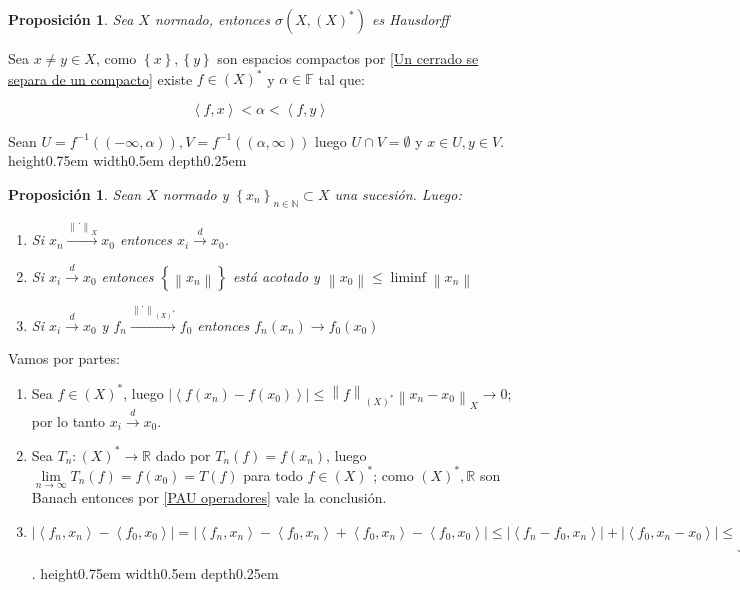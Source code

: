 \documentclass[11pt]{article}
\newcommand{\R}{{\mathbb{R}}}
\newcommand{\N}{{\mathbb{N}}}
\newcommand{\dual}[1]{\left(#1\right)^{\ast}}
\newcommand{\norm}[1]{\left\lVert#1\right\rVert}
\newcommand{\abs}[1]{\left\lvert#1\right\rvert}
\newcommand{\ip}[1]{\left\langle#1\right\rangle}
\newcommand{\sett}[1]{\left\lbrace#1\right\rbrace}
\numberwithin{theorem}{subsection}
\newtheorem{proposition}[theorem]{Proposici\'on}
\newenvironment{proof}[1][Demostraci\'on]{\begin{trivlist}
		\item[\hskip \labelsep {\bfseries #1}]}{\end{trivlist}}
\newcommand{\qed}{\nobreak \ifvmode \relax \else
	\ifdim\lastskip<1.5em \hskip-\lastskip
	\hskip1.5em plus0em minus0.5em \fi \nobreak
	\vrule height0.75em width0.5em depth0.25em\fi}
\begin{document}
\begin{proposition}
	\label{Topologia debil es Hausdorff}
	Sea $X$ normado, entonces $\sigma(X,\dual{X})$ es Hausdorff	
\end{proposition}

\begin{proof}
	Sea $x \neq y \in X$, como $\sett{x}, \sett{y}$ son espacios compactos por \ref{Un cerrado se separa de un compacto} existe $f \in \dual{X}$ y $\alpha \in \mathbb{F}$ tal que:
	
	
	\begin{equation*}
	\ip{f, x} < \alpha < \ip{f,y}
	\end{equation*}
	
	Sean $U = f^{-1}(\left(-\infty, \alpha\right)), V = f^{-1}(\left(\alpha, \infty\right))$ luego $U \cap V = \emptyset$ y $x \in U, y \in V$. \qed
	
\end{proof}

\begin{proposition}
	\label{Resultados de convergencia debil}
	Sean $X$ normado y $\sett{x_n}_{n \in \N} \subset X$ una sucesi\'on. Luego:
	
	
	\begin{enumerate}
		\item Si $x_n \xrightarrow{\norm{.}_X} x_0$ entonces $x_i \xrightarrow{d} x_0$.
		\item Si $x_i \xrightarrow{d} x_0$ entonces $\sett{\norm{x_n}}$ est\'a acotado y $\norm{x_0} \leq \liminf \norm{x_n}$
		\item Si $x_i \xrightarrow{d} x_0$  y $f_n \xrightarrow{\norm{.}_{\dual{X}}} f_0$ entonces $f_n(x_n) \rightarrow f_0(x_0)$
	\end{enumerate}
	
\end{proposition}

\begin{proof}
	Vamos por partes:
	
	\begin{enumerate}
		\item Sea $f \in \dual{X}$, luego $\abs{\ip{f(x_n) - f(x_0)}} \leq \norm{f}_{\dual{X}} \norm{x_n-x_0}_X \rightarrow 0$; por lo tanto $x_i \xrightarrow{d} x_0$.
		\item Sea $T_n : \dual{X} \rightarrow \R$ dado por $T_n(f) = f(x_n)$, luego $\lim\limits_{n \rightarrow \infty}{T_n(f)} = f(x_0) = T(f)$ para todo $f \in \dual{X}$; como $\dual{X}, \R$ son Banach entonces por \ref{PAU operadores} vale la conclusi\'on.
		\item $\abs{\ip{f_n,x_n} - \ip{f_0,x_0}} = \abs{\ip{f_n,x_n} - \ip{f_0,x_n} + \ip{f_0,x_n} - \ip{f_0,x_0}} \leq \abs{\ip{f_n -f_0,x_n}} + \abs{\ip{f_0,x_n - x_0}} \leq \underbrace{\norm{x_n}_X}_{\leq C} \underbrace{\norm{f_n-f_0}_{\dual{X}}}_{\rightarrow 0} + \underbrace{\abs{\ip{f_0,x_n - x_0}}}_{\rightarrow 0} \rightarrow 0$. \qed
	\end{enumerate}
	
\end{proof}
\end{document}
